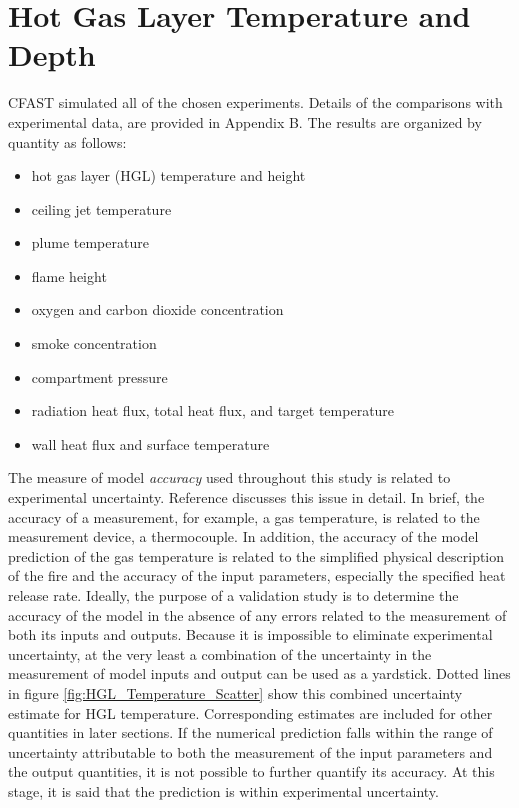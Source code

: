 \chapter{Hot Gas Layer Temperature and Depth}

\label{HGL:Chapter}

CFAST simulated all of the chosen experiments.  Details of the comparisons with experimental data, are provided in Appendix B.  The results are organized by quantity as follows:

\begin{itemize}
\item hot gas layer (HGL) temperature and height
\item ceiling jet temperature
\item plume temperature
\item flame height
\item oxygen and carbon dioxide concentration
\item smoke concentration
\item compartment pressure
\item radiation heat flux, total heat flux, and target temperature
\item wall heat flux and surface temperature
\end{itemize}

The measure of model \emph{accuracy} used throughout this study is related to experimental uncertainty. Reference \cite{NRCNUREG1824}  discusses this issue in detail. In brief, the accuracy of a measurement, for example, a gas temperature, is related to the measurement device, a thermocouple. In addition, the accuracy of the model prediction of the gas temperature is related to the simplified physical description of the fire and the accuracy of the input parameters, especially the specified heat release rate. Ideally, the purpose of a validation study is to determine the accuracy of the model in the absence of any errors related to the measurement of both its inputs and outputs. Because it is impossible to eliminate experimental uncertainty, at the very least a combination of the uncertainty in the measurement of model inputs and output can be used as a yardstick. Dotted lines in figure \ref{fig:HGL_Temperature_Scatter}  show this combined uncertainty estimate for HGL temperature. Corresponding estimates are included for other quantities in later sections. If the numerical prediction falls within the range of uncertainty attributable to both the measurement of the input parameters and the output quantities, it is not possible to further quantify its accuracy. At this stage, it is said that the prediction is within experimental uncertainty.

